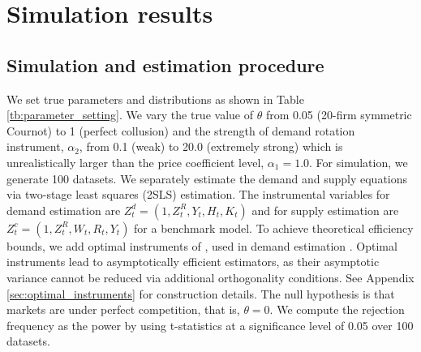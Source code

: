 \documentclass[11pt, a4paper]{article}
\begin{document}
\section{Simulation results}\label{sec:results}

\subsection{Simulation and estimation procedure}

We set true parameters and distributions as shown in Table \ref{tb:parameter_setting}. 
We vary the true value of $\theta$ from 0.05 (20-firm symmetric Cournot) to 1 (perfect collusion) and the strength of demand rotation instrument, $\alpha_2$, from 0.1 (weak) to 20.0 (extremely strong) which is unrealistically larger than the price coefficient level, $\alpha_1=1.0$.
For simulation, we generate 100 datasets.
We separately estimate the demand and supply equations via two-stage least squares (2SLS) estimation.
The instrumental variables for demand estimation are $Z^{d}_{t} = (1, Z^{R}_{t}, Y_{t}, H_{t}, K_{t})$ and for supply estimation are $Z^{c}_{t} = (1, Z^{R}_{t}, W_{t}, R_{t}, Y_{t})$ for a benchmark model. 
To achieve theoretical efficiency bounds, we add optimal instruments of \cite{chamberlain1987asymptotic}, used in demand estimation \citep{reynaert2014improving}. 
Optimal instruments lead to asymptotically efficient estimators, as their asymptotic variance cannot be reduced via additional orthogonality conditions.
See Appendix \ref{sec:optimal_instruments} for construction details.
The null hypothesis is that markets are under perfect competition, that is, $\theta=0$.
We compute the rejection
frequency as the power by using t-statistics at a significance level of 0.05 over 100 datasets.
\end{document}

